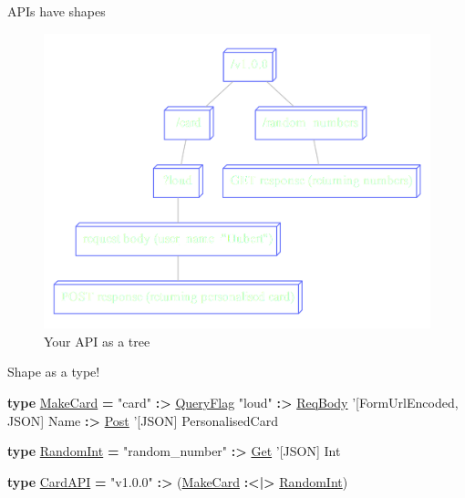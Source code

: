 \documentclass[ignorenonframetext,]{beamer}
\newenvironment{Shaded}{}{}
\newcommand{\KeywordTok}[1]{\textcolor[rgb]{0.26,0.66,0.93}{\textbf{{#1}}}}
\newcommand{\DataTypeTok}[1]{\underline{{#1}}}
\newcommand{\CharTok}[1]{\textcolor[rgb]{0.02,0.61,0.04}{{#1}}}
\newcommand{\StringTok}[1]{\textcolor[rgb]{0.02,0.61,0.04}{{#1}}}
\newcommand{\FunctionTok}[1]{\textcolor[rgb]{1.00,0.58,0.35}{\textbf{{#1}}}}
\newcommand{\NormalTok}[1]{{#1}}
\begin{document}
\begin{frame}{APIs have shapes}

\begin{figure}[htbp]
\centering
\includegraphics{tree.png}
\caption{Your API as a tree}
\end{figure}

\end{frame}

\begin{frame}[fragile]{Shape as a type!}

\begin{Shaded}
\begin{Highlighting}[]

\KeywordTok{type} \DataTypeTok{MakeCard} \FunctionTok{=}
    \StringTok{"card"}
    \FunctionTok{:>} \DataTypeTok{QueryFlag} \StringTok{"loud"}
    \FunctionTok{:>} \DataTypeTok{ReqBody} \CharTok{'[FormUrlEncoded, JSON] Name}
    \FunctionTok{:>} \DataTypeTok{Post} \CharTok{'[JSON] PersonalisedCard}

\KeywordTok{type} \DataTypeTok{RandomInt} \FunctionTok{=}
    \StringTok{"random_number"} \FunctionTok{:>} \DataTypeTok{Get} \CharTok{'[JSON] Int}

\KeywordTok{type} \DataTypeTok{CardAPI} \FunctionTok{=} \StringTok{"v1.0.0"} \FunctionTok{:>} \NormalTok{(}\DataTypeTok{MakeCard} \FunctionTok{:<|>} \DataTypeTok{RandomInt}\NormalTok{)}
\end{Highlighting}
\end{Shaded}

\end{frame}
\end{document}
